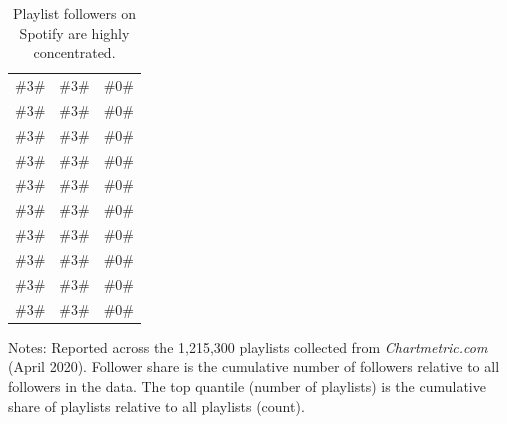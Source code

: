 \begin{table}[H]
\caption{Playlist followers on Spotify are highly concentrated.\label{tab:distribution}}
  \begin{adjustbox}{width = 0.7\textwidth, center}
      \begin{threeparttable}[b]
\begin{tabular}{S[table-align-text-post=false] S[table-align-text-post=false] S[table-align-text-post=false]}
\hline 
{} &  &  \\ \hline 
\#3\# & \#3\# & \#0\#  \tabularnewline
\#3\# & \#3\# & \#0\#  \tabularnewline
\#3\# & \#3\# & \#0\#  \tabularnewline
\#3\# & \#3\# & \#0\#  \tabularnewline
\#3\# & \#3\# & \#0\#  \tabularnewline
\#3\# & \#3\# & \#0\#  \tabularnewline
\#3\# & \#3\# & \#0\#  \tabularnewline
\#3\# & \#3\# & \#0\#  \tabularnewline
\#3\# & \#3\# & \#0\#  \tabularnewline
\#3\# & \#3\# & \#0\#  \tabularnewline
\hline 
\end{tabular}
\vspace{-0.1cm}
\begin{tablenotes}\footnotesize 
\item  Notes: Reported across the 1,215,300 playlists collected from \textit{Chartmetric.com} (April 2020). Follower share is the cumulative number of followers relative to all followers in the data. The top quantile (number of playlists) is the cumulative share of playlists relative to all playlists (count).
\end{tablenotes}
      \end{threeparttable}
   \end{adjustbox}  
\end{table}
